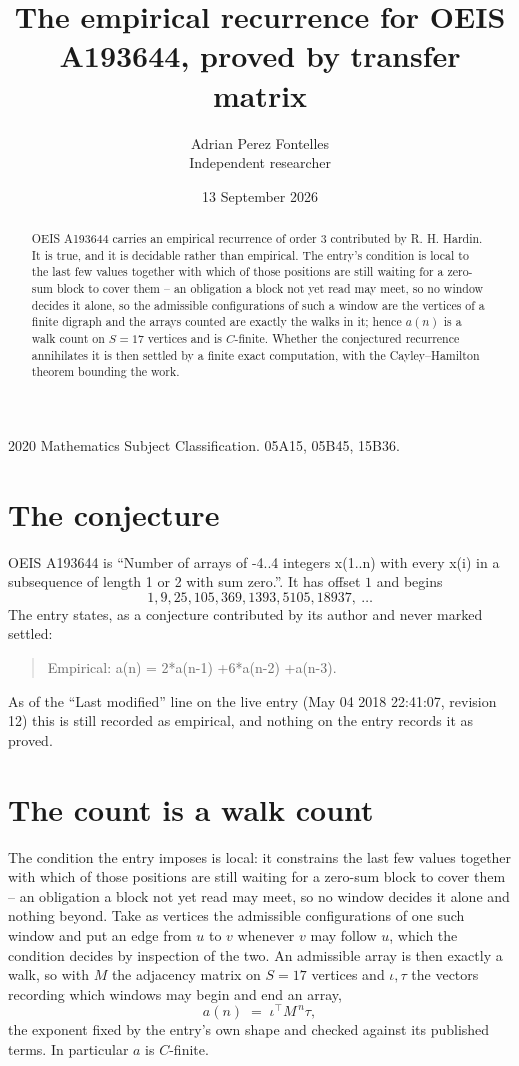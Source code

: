 \documentclass[11pt,a4paper]{article}
\title{The empirical recurrence for OEIS A193644, proved by transfer matrix}
\author{Adrian Perez Fontelles\\ \small Independent researcher}
\date{13 September 2026}
\theoremstyle{plain}
\theoremstyle{definition}
\begin{document}
\maketitle

\begin{abstract}
OEIS A193644 carries an empirical recurrence of order $3$ contributed by R. H. Hardin. It is
true, and it is decidable rather than empirical. The entry's condition is local to the last few values together with which of those positions are still waiting for a zero-sum block to cover them -- an obligation a block not yet read may meet, so no window decides it alone, so
the admissible configurations of such a window are the vertices of a finite digraph and the
arrays counted are exactly the walks in it; hence $a(n)$ is a walk count on $S=17$ vertices
and is $C$-finite. Whether the conjectured recurrence annihilates it is then settled by a
finite exact computation, with the Cayley--Hamilton theorem bounding the work.
\end{abstract}

\noindent\small 2020 Mathematics Subject Classification. 05A15, 05B45, 15B36.\normalsize

\section{The conjecture}

OEIS A193644 is ``Number of arrays of -4..4 integers x(1..n) with every x(i) in a subsequence of length 1 or 2 with sum zero.''. It has offset $1$ and begins
\[
1, 9, 25, 105, 369, 1393, 5105, 18937,\ \dots
\]
The entry states, as a conjecture contributed by its author and never marked settled:
\begin{quote}
Empirical: a(n) = 2*a(n-1) +6*a(n-2) +a(n-3).
\end{quote}
As of the ``Last modified'' line on the live entry (May 04 2018 22:41:07, revision 12) this is still
recorded as empirical, and nothing on the entry records it as proved.

\section{The count is a walk count}

The condition the entry imposes is local: it constrains the last few values together with which of those positions are still waiting for a zero-sum block to cover them -- an obligation a block not yet read may meet, so no window decides it alone and nothing beyond. Take as
vertices the admissible configurations of one such window and put an edge from $u$ to $v$
whenever $v$ may follow $u$, which the condition decides by inspection of the two. An
admissible array is then exactly a walk, so with $M$ the adjacency matrix on $S=17$ vertices
and $\iota,\tau$ the vectors recording which windows may begin and end an array,
\[
a(n)\;=\;\iota^{\!\top}M^{\,n}\tau ,
\]
the exponent fixed by the entry's own shape and checked against its published terms. In
particular $a$ is $C$-finite.
\end{document}
